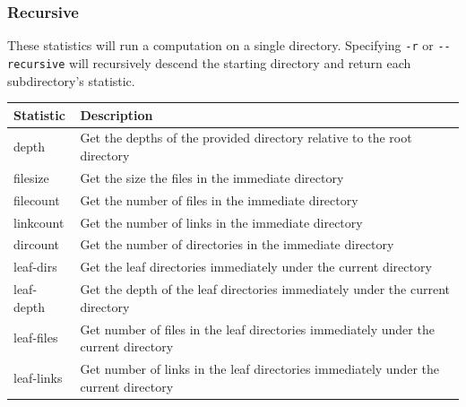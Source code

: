 \subsubsection{Recursive}
These statistics will run a computation on a single
directory. Specifying \texttt{-r} or \texttt{-{}-recursive} will
recursively descend the starting directory and return each
subdirectory's statistic.
\\
\begin{tabularx}{\textwidth}{| l | X |}
  \hline
  Statistic & Description \\
  \hline
  depth & Get the depths of the provided directory relative to the root
  directory \\
  \hline
  filesize & Get the size the files in the immediate directory \\
  \hline
  filecount & Get the number of files in the immediate directory \\
  \hline
  linkcount & Get the number of links in the immediate directory \\
  \hline
  dircount & Get the number of directories in the immediate directory \\
  \hline
  leaf-dirs & Get the leaf directories immediately under the current
  directory \\
  \hline
  leaf-depth & Get the depth of the leaf directories immediately under
  the current directory \\
  \hline
  leaf-files & Get number of files in the leaf directories immediately
  under the current directory \\
  \hline
  leaf-links & Get number of links in the leaf directories immediately
  under the current directory \\
  \hline
\end{tabularx}

